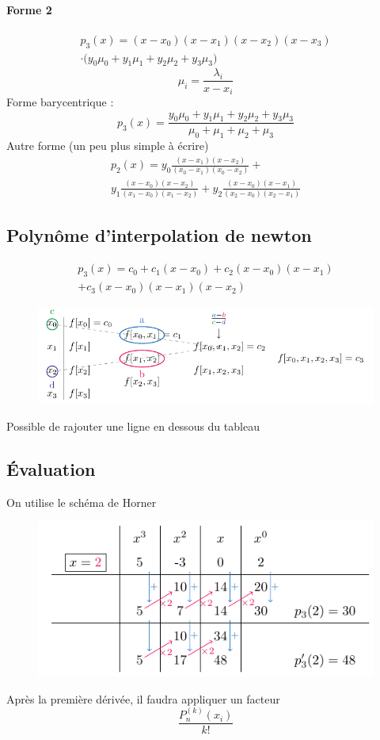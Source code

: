 \documentclass[resume]{subfiles}
\begin{document}
    \paragraph{Forme 2}
    \begin{multline*}
    p_3(x)=(x-x_0)(x-x_1)(x-x_2)(x-x_3)\\ \cdot\big(y_0\mu_0+y_1\mu_1+y_2\mu_2+y_3\mu_3\big)    
    \end{multline*}
    $$\mu_i=\frac{\lambda_i}{x-x_i}$$
    Forme barycentrique :
    $$p_3(x)=\frac{y_0\mu_0+y_1\mu_1+y_2\mu_2+y_3\mu_3}{\mu_0+\mu_1+\mu_2+\mu_3}$$
Autre forme (un peu plus simple à écrire)
\begin{multline*}
p_2(x)=y_0\frac{(x-x_1)(x-x_2)}{(x_0-x_1)(x_0-x_2)}+\\y_1\frac{(x-x_0)(x-x_2)}{(x_1-x_0)(x_1-x_2)}+y_2\frac{(x-x_0)(x-x_1)}{(x_2-x_0)(x_2-x_1)}
\end{multline*}
    
    \subsection{Polynôme d'interpolation de newton}
    \begin{multline*}
    p_3(x)=c_0+c_1(x-x_0) +c_2(x-x_0)(x-x_1)\\ +c_3(x-x_0)(x-x_1)(x-x_2)
    \end{multline*}
    \begin{figure}[H]
        \centering
        \includegraphics[width=\columnwidth]{drwg_3.pdf}
    \end{figure}
    Possible de rajouter une ligne en dessous du tableau
    
    \subsection{Évaluation}
    On utilise le schéma de Horner
    \begin{figure}[H]
        \centering
        \includegraphics[width=0.8\columnwidth]{drwg_4.pdf}
    \end{figure}
    Après la première dérivée, il faudra appliquer un facteur
    $$\frac{P_n^{(k)}(x_i)}{k!}$$
\end{document}
